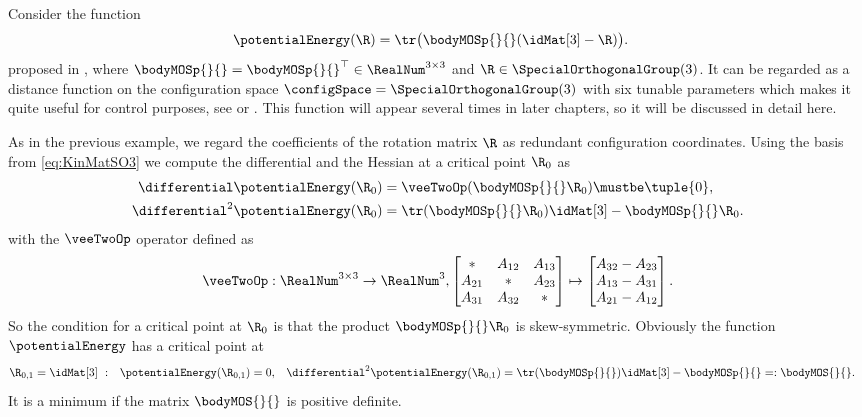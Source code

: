 \begin{Example}\label{ex:PotentialSO3}
Consider the function
\begin{align}\label{eq:PotentialSO3}
 \potentialEnergy(\R) &= \tr \big( \bodyMOSp{}{} (\idMat[3] - \R) \big)
 .
\end{align}
proposed in \cite{Koditschek:TotalEnergy}, where $\bodyMOSp{}{} = \bodyMOSp{}{}^\top \in \RealNum^{3\times 3}$ and $\R \in \SpecialOrthogonalGroup(3)$.
It can be regarded as a distance function on the configuration space $\configSpace = \SpecialOrthogonalGroup(3)$ with six tunable parameters which makes it quite useful for control purposes, see \eg \cite{Bullo:TrackingAutomatica} or \cite{Lee:QuadrotorGeoControl}.
This function will appear several times in later chapters, so it will be discussed in detail here.

As in the previous example, we regard the coefficients of the rotation matrix $\R$ as redundant configuration coordinates.
Using the basis from \eqref{eq:KinMatSO3} we compute the differential and the Hessian at a critical point $\R_0$ as
\begin{subequations}
\begin{align}
 \label{eq:gradPotentialSO3}
 \differential \potentialEnergy(\R_0) &= \veeTwoOp(\bodyMOSp{}{} \R_0) \mustbe \tuple{0},
\\
 \label{eq:HessianPotentialSO3}
 \differential^2 \potentialEnergy(\R_0) &= \tr (\bodyMOSp{}{} \R_0) \idMat[3] - \bodyMOSp{}{} \R_0.
\end{align} 
\end{subequations}
with the $\veeTwoOp$ operator defined as
\begin{align}
 \veeTwoOp : \RealNum^{3\times3} \rightarrow \RealNum^3, \begin{bmatrix} \ast & A_{12} & A_{13} \\ A_{21} & \ast & A_{23} \\ A_{31} & A_{32} & \ast \end{bmatrix} \mapsto \begin{bmatrix} A_{32}-A_{23} \\ A_{13}-A_{31} \\ A_{21}-A_{12} \end{bmatrix}.
\end{align}
So the condition for a critical point at $\R_0$ is that the product $\bodyMOSp{}{} \R_0$ is skew-symmetric.
Obviously the function $\potentialEnergy$ has a critical point at
\begin{align*}
 \R_{0,1} &= \idMat[3] \ :&
 \potentialEnergy(\R_{0,1}) &= 0,&
 \differential^2 \potentialEnergy(\R_{0,1}) &= \tr(\bodyMOSp{}{}) \idMat[3] - \bodyMOSp{}{} =: \bodyMOS{}{}.
\end{align*}
It is a minimum if the matrix $\bodyMOS{}{}$ is positive definite. 


\end{Example}
